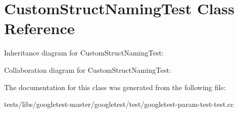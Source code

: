 \hypertarget{classCustomStructNamingTest}{}\section{Custom\+Struct\+Naming\+Test Class Reference}
\label{classCustomStructNamingTest}


Inheritance diagram for Custom\+Struct\+Naming\+Test\+:


Collaboration diagram for Custom\+Struct\+Naming\+Test\+:


The documentation for this class was generated from the following file\+:\begin{DoxyCompactItemize}
\item 
tests/libs/googletest-\/master/googletest/test/googletest-\/param-\/test-\/test.\+cc\end{DoxyCompactItemize}
